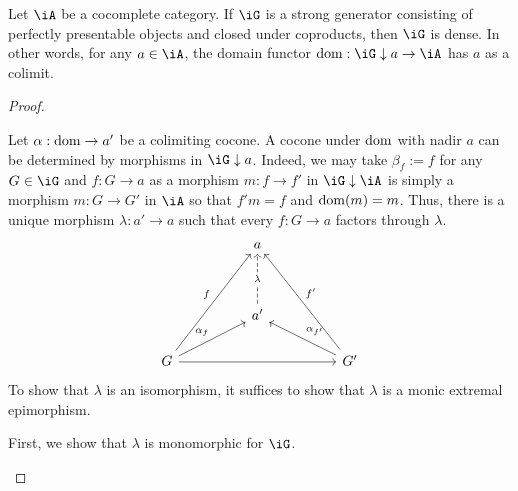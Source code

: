 \documentclass{zett}
\begin{document}
\begin{lem}
  Let $\iA$ be a cocomplete category.
  If $\iG$ is a strong generator consisting of perfectly presentable objects and closed under coproducts, then $\iG$ is dense.
  In other words, for any $a \in \iA$, the domain functor $\dom : \iG \dn a \to \iA$ has $a$ as a colimit.
\end{lem}
\begin{proof}
  \begin{node}
    Let $\alpha : \operatorname{dom} \to a'$ be a colimiting cocone.
    A cocone under $\operatorname{dom}$ with nadir $a$ can be determined by morphisms in $\iG \dn a$.
    Indeed, we may take $\beta_{f} := f$ for any $G \in \iG$ and $f : G \to a$ as a morphism $m : f \to f'$ in $\iG \dn \iA$ is simply a morphism $m : G \to G'$ in $\iA$ so that $f'm = f$ and $\operatorname{dom}(m) = m$.
    Thus, there is a unique morphism $\lambda : a' \to a$ such that every $f : G \to a$ factors through $\lambda$.
    \[\begin{tikzcd}
	&& a \\
	\\
	&& {a'} \\
	G &&&& {G'}
	\arrow["{\alpha_{f}}", from=4-1, to=3-3]
	\arrow["{\alpha_{f'}}"', from=4-5, to=3-3]
	\arrow["f", from=4-1, to=1-3]
	\arrow["{f'}"', from=4-5, to=1-3]
	\arrow[from=4-1, to=4-5]
	\arrow["\lambda"{description}, dashed, from=3-3, to=1-3]
      \end{tikzcd}\]
    To show that $\lambda$ is an isomorphism, it suffices to show that $\lambda$ is a monic extremal epimorphism.
  \end{node}
  \begin{node}
    First, we show that $\lambda$ is monomorphic for $\iG$.
  \end{node}
\end{proof}
\end{document}
